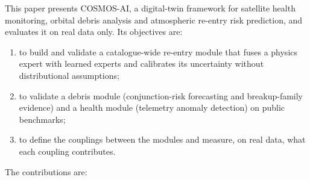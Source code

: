 \documentclass[
]{article}
\providecommand{\tightlist}{%
  \setlength{\itemsep}{0pt}\setlength{\parskip}{0pt}}
\begin{document}
This paper presents COSMOS-AI, a digital-twin framework for satellite
health monitoring, orbital debris analysis and atmospheric re-entry risk
prediction, and evaluates it on real data only. Its objectives are:

\begin{enumerate}
\def\labelenumi{\arabic{enumi}.}
\tightlist
\item
  to build and validate a catalogue-wide re-entry module that fuses a
  physics expert with learned experts and calibrates its uncertainty
  without distributional assumptions;
\item
  to validate a debris module (conjunction-risk forecasting and
  breakup-family evidence) and a health module (telemetry anomaly
  detection) on public benchmarks;
\item
  to define the couplings between the modules and measure, on real data,
  what each coupling contributes.
\end{enumerate}

The contributions are:
\end{document}
